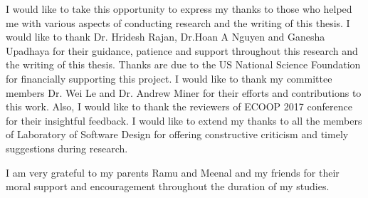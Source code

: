 I would like to take this opportunity to express my thanks to those who helped me with various
aspects of conducting research and the writing of this thesis. I would like to thank Dr. Hridesh Rajan, Dr.Hoan A Nguyen and Ganesha Upadhaya
for their guidance, patience and support throughout this research and the writing of this thesis. Thanks
are due to the US National Science Foundation for financially supporting this project.
I would like to thank my committee members Dr. Wei Le and Dr. Andrew Miner for their
efforts and contributions to this work. Also, I would like to thank the reviewers of ECOOP 2017 conference for their insightful feedback. I would like to extend my thanks to all the members of Laboratory of Software Design for offering constructive criticism and timely suggestions
during research.
\par I am very grateful to my parents Ramu and Meenal and my friends for their moral support and encouragement throughout the duration of my studies.